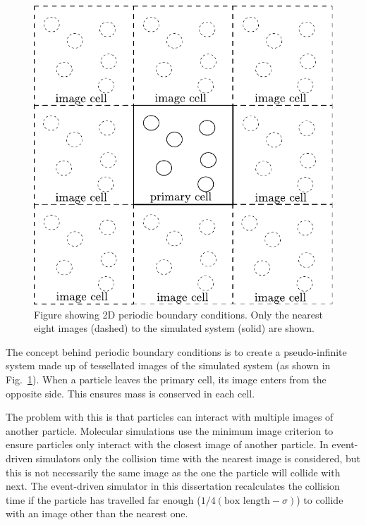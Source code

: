 \documentclass[12pt]{UoAthesis} \usepackage{booktabs}
\begin{document}
\begin{figure}[htp] 
  \begin{center}
    \includegraphics[clip, scale = 0.8]{figures/PBC} 
    \caption [Figure showing 2D periodic boundary conditions]
    {\label{fig:PBC} Figure showing 2D periodic boundary
      conditions. Only the nearest eight images (dashed) to the simulated
      system (solid) are shown.}
  \end{center}
\end{figure}

The concept behind periodic boundary conditions is to create a
pseudo-infinite system made up of tessellated images of the simulated
system (as shown in Fig.~\ref{fig:PBC}).  When a particle leaves the
primary cell, its image enters from the opposite side.  This ensures
mass is conserved in each cell.  

The problem with this is that particles can interact with multiple
images of another particle.  Molecular simulations use the minimum
image criterion to ensure particles only interact with the
closest image of another particle. In event-driven simulators only the
collision time with the nearest image is considered, but this is not
necessarily the same image as the one the particle will collide with
next.  The event-driven simulator in this dissertation recalculates the
collision time if the particle has travelled far enough ($1/4 (\text{box
length}-\sigma)$) to collide with an image other than the nearest one.
\end{document}
